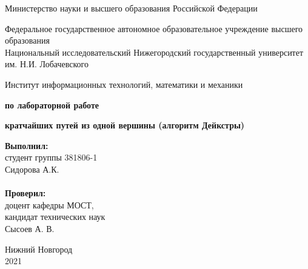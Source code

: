 \documentclass{report}
\begin{document}
\begin{titlepage}

\begin{center}
Министерство науки и высшего образования Российской Федерации
\end{center}

\begin{center}
Федеральное государственное автономное образовательное учреждение высшего образования \\
Национальный исследовательский Нижегородский государственный университет им. Н.И. Лобачевского
\end{center}

\begin{center}
Институт информационных технологий, математики и механики
\end{center}

\vspace{4em}

\begin{center}
\textbf{ по лабораторной работе} \\
\end{center}
\begin{center}
\textbf{ кратчайших путей из одной вершины (алгоритм Дейкстры)} \\
\end{center}

\vspace{4em}

\newbox{\lbox}
\newlength{\maxl}
\setlength{\maxl}{\wd\lbox}
\hfill\parbox{7cm}{
\hspace*{5cm}\hspace*{-5cm}\textbf{Выполнил:} \\ студент группы 381806-1 \\ Сидорова А.К.\\
\\
\hspace*{5cm}\hspace*{-5cm}\textbf{Проверил:}\\ доцент кафедры МОСТ, \\ кандидат технических наук \\ Сысоев А. В.
}

\vspace{\fill}

\begin{center} Нижний Новгород \\ 2021 \end{center}

\end{titlepage}
\end{document}
